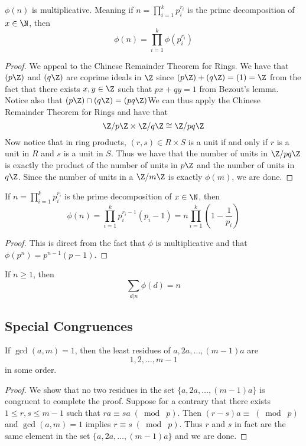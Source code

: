 \documentclass[a4paper]{article}
\begin{document}
\begin{thm}{}{} $\phi(n)$ is multiplicative. Meaning if $n=\prod_{i=1}^kp_i^{r_i}$ is the prime decomposition of $x\in\N$, then $$\phi(n)=\prod_{i=1}^k\phi(p_i^{r_i})$$ \tcbline
\begin{proof}
We appeal to the Chinese Remainder Theorem for Rings. We have that $(p\Z)$ and $(q\Z)$ are coprime ideals in $\Z$ since $(p\Z)+(q\Z)=(1)=\Z$ from the fact that there exists $x,y\in\Z$ such that $px+qy=1$ from Bezout's lemma. Notice also that $(p\Z)\cap(q\Z)=(pq\Z)$We can thus apply the Chinese Remainder Theorem for Rings and have that $$\Z/p\Z\times\Z/q\Z\cong\Z/pq\Z$$ Now notice that in ring products, $(r,s)\in R\times S$ is a unit if and only if $r$ is a unit in $R$ and $s$ is a unit in $S$. Thus we have that the number of units in $\Z/pq\Z$ is exactly the product of the number of units in $p\Z$ and the number of units in $q\Z$. Since the number of units in a $\Z/m\Z$ is exactly $\phi(m)$, we are done. 
\end{proof}
\end{thm}

\begin{crl}{}{} If $n=\prod_{i=1}^kp_i^{r_i}$ is the prime decomposition of $x\in\N$, then $$\phi(n)=\prod_{i=1}^kp_i^{r_i-1}(p_i-1)=n\prod_{i=1}^k\left(1-\frac{1}{p_i}\right)$$ \tcbline
\begin{proof}
This is direct from the fact that $\phi$ is multiplicative and that $\phi(p^n)=p^{n-1}(p-1)$. 
\end{proof}
\end{crl}

\begin{thm}{}{} If $n\geq 1$, then $$\sum_{d|n}\phi(d)=n$$
\end{thm}

\subsection{Special Congruences}
\begin{lmm}{}{} If $\gcd(a,m)=1$, then the least residues of $a,2a,\dots,(m-1)a$ are $$1,2,\dots,m-1$$ in some order. \tcbline
\begin{proof}
We show that no two residues in the set $\{a,2a,\dots,(m-1)a\}$ is congruent to complete the proof. Suppose for a contrary that there exists $1\leq r,s\leq m-1$ such that $ra\equiv sa\;(\bmod\;p)$. Then $(r-s)a\equiv\;(\bmod\;p)$ and $\gcd(a,m)=1$ implies $r\equiv s\;(\bmod\;p)$. Thus $r$ and $s$ in fact are the same element in the set $\{a,2a,\dots,(m-1)a\}$ and we are done. 
\end{proof}
\end{lmm}
\end{document}
